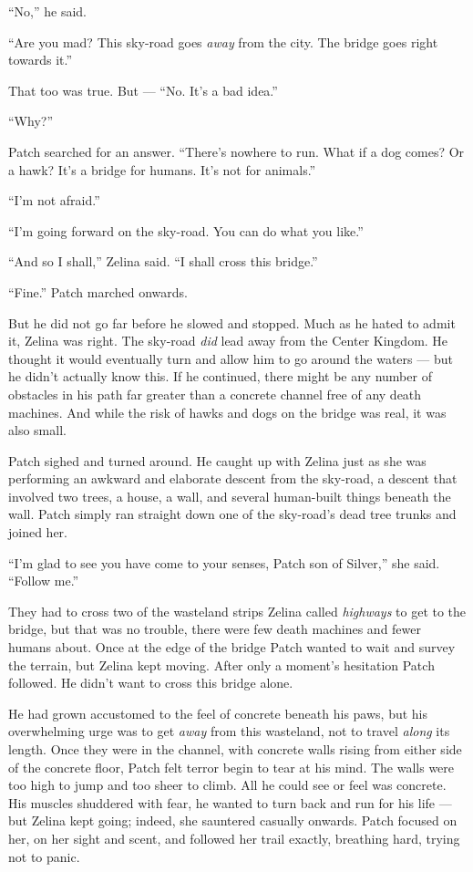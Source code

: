 \documentclass[ebook,oneside,openany,12pt]{memoir}
\begin{document}
“No,” he said.

“Are you mad? This sky-road goes \emph{away} from the city. The
bridge goes right towards it.”

That too was true. But — “No. It’s a bad idea.”

“Why?”

Patch searched for an answer. “There’s nowhere to run. What if a dog
comes? Or a hawk? It’s a bridge for humans. It’s not for animals.”

“I’m not afraid.”

“I’m going forward on the sky-road. You can do what you like.”

“And so I shall,” Zelina said. “I shall cross this bridge.”

“Fine.” Patch marched onwards.

But he did not go far before he slowed and stopped. Much as he hated
to admit it, Zelina was right. The sky-road \emph{did} lead away
from the Center Kingdom. He thought it would eventually turn and allow
him to go around the waters — but he didn’t actually know this. If he
continued, there might be any number of obstacles in his path far
greater than a concrete channel free of any death machines. And while
the risk of hawks and dogs on the bridge was real, it was also small.

Patch sighed and turned around. He caught up with Zelina just as she
was performing an awkward and elaborate descent from the sky-road, a
descent that involved two trees, a house, a wall, and several
human-built things beneath the wall. Patch simply ran straight down
one of the sky-road’s dead tree trunks and joined her.

“I’m glad to see you have come to your senses, Patch son of Silver,”
she said. “Follow me.”

They had to cross two of the wasteland strips Zelina called
\emph{highways} to get to the bridge, but that was no trouble, there
were few death machines and fewer humans about. Once at the edge of
the bridge Patch wanted to wait and survey the terrain, but Zelina
kept moving. After only a moment’s hesitation Patch followed. He
didn’t want to cross this bridge alone.

He had grown accustomed to the feel of concrete beneath his paws, but
his overwhelming urge was to get \emph{away} from this wasteland,
not to travel \emph{along} its length. Once they were in the
channel, with concrete walls rising from either side of the concrete
floor, Patch felt terror begin to tear at his mind. The walls were too
high to jump and too sheer to climb. All he could see or feel was
concrete. His muscles shuddered with fear, he wanted to turn back and
run for his life — but Zelina kept going; indeed, she sauntered
casually onwards. Patch focused on her, on her sight and scent, and
followed her trail exactly, breathing hard, trying not to panic.
\end{document}
